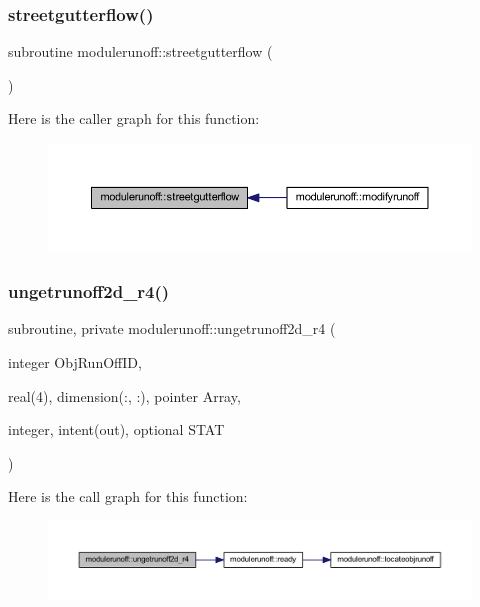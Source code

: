 \subsubsection{\texorpdfstring{streetgutterflow()}{streetgutterflow()}}
{\footnotesize\ttfamily subroutine modulerunoff\+::streetgutterflow (\begin{DoxyParamCaption}{ }\end{DoxyParamCaption})\hspace{0.3cm}{\ttfamily [private]}}

Here is the caller graph for this function\+:\nopagebreak
\begin{figure}[H]
\begin{center}
\leavevmode
\includegraphics[width=350pt]{namespacemodulerunoff_a5cc041140596592ca2cd2f67dfadd9a7_icgraph}
\end{center}
\end{figure}
\mbox{\label{namespacemodulerunoff_acd023a67da604bbfb903587e80244138}} 
\subsubsection{\texorpdfstring{ungetrunoff2d\+\_\+r4()}{ungetrunoff2d\_r4()}}
{\footnotesize\ttfamily subroutine, private modulerunoff\+::ungetrunoff2d\+\_\+r4 (\begin{DoxyParamCaption}\item[{integer}]{Obj\+Run\+Off\+ID,  }\item[{real(4), dimension(\+:, \+:), pointer}]{Array,  }\item[{integer, intent(out), optional}]{S\+T\+AT }\end{DoxyParamCaption})\hspace{0.3cm}{\ttfamily [private]}}

Here is the call graph for this function\+:\nopagebreak
\begin{figure}[H]
\begin{center}
\leavevmode
\includegraphics[width=350pt]{namespacemodulerunoff_acd023a67da604bbfb903587e80244138_cgraph}
\end{center}
\end{figure}
\mbox{\label{namespacemodulerunoff_af00779fc9a81a3cdf2947f1c7990d1c8}} 
